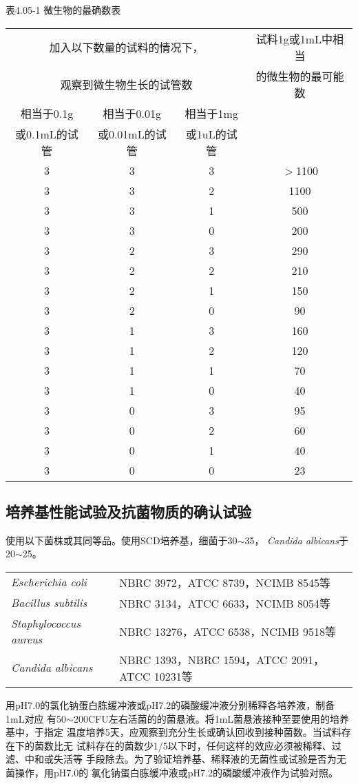 \documentclass[11pt,a4paper]{article}
\newenvironment{SC}{%
  \CJKfamily{gbsn}%
  \CJKtilde
  \CJKnospace}{}
\begin{document}
\begin{CJK}{UTF8}{}
\begin{SC}
\begin{table}[tb]
\begin{center}
表4.05-1 微生物的最确数表\\
\begin{tabular}{c|c|c|c}
\hline
\multicolumn{3}{c|}{加入以下数量的试料的情况下，}&试料1g或1mL中相当\\
\multicolumn{3}{c|}{观察到微生物生长的试管数}&的微生物的最可能数\\
\cline{1-3}
相当于0.1g&相当于0.01g&相当于1mg\\
或0.1mL的试管&或0.01mL的试管&或1uL的试管\\
\hline
3&3&3&$>$1100\\
3&3&2&1100\\
3&3&1&500\\
3&3&0&200\\
\hline
3&2&3&290\\
3&2&2&210\\
3&2&1&150\\
3&2&0&90\\
\hline
3&1&3&160\\
3&1&2&120\\
3&1&1&70\\
3&1&0&40\\
\hline
3&0&3&95\\
3&0&2&60\\
3&0&1&40\\
3&0&0&23\\
\hline
\end{tabular}
\end{center}
\end{table}

\subsection*{培养基性能试验及抗菌物质的确认试验}
使用以下菌株或其同等品。使用SCD培养基，细菌于30$\sim$35\textcelsius，
\textsl{Candida albicans}于20$\sim$25。\endnote{}\\
\begin{tabular}{ll}
\textsl{Escherichia coli}	&NBRC 3972，ATCC 8739，NCIMB 8545等\\
\textsl{Bacillus subtilis}	&NBRC 3134，ATCC 6633，NCIMB 8054等\\
\textsl{Staphylococcus aureus}	&NBRC 13276，ATCC 6538，NCIMB 9518等\\
\textsl{Candida albicans}	&NBRC 1393，NBRC 1594，ATCC 2091，ATCC 10231等\\
\end{tabular}
用pH7.0的氯化钠蛋白胨缓冲液或pH7.2的磷酸缓冲液分别稀释各培养液，制备1mL对应
有50$\sim$200CFU左右活菌的的菌悬液。将1mL菌悬液接种至要使用的培养基中，于指定
温度培养5天，应观察到充分生长或确认回收到接种菌数。当试料存在下的菌数比无
试料存在的菌数少1/5以下时，任何这样的效应必须被稀释、过滤、中和或失活等
手段除去。为了验证培养基、稀释液的无菌性或试验是否为无菌操作，用pH7.0的
氯化钠蛋白胨缓冲液或pH7.2的磷酸缓冲液作为试验对照。\\
%

\end{SC}
\end{CJK}
\end{document}
